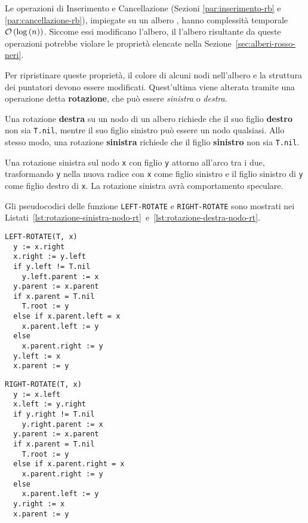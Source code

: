 \documentclass[italian, 10pt]{article}
\begin{document}
Le operazioni di Inserimento e Cancellazione (Sezioni \ref{par:inserimento-rb} e \ref{par:cancellazione-rb}), impiegate su un albero \RB, hanno complessità temporale \(\mathcal{O}\left(\log{(n)}\right)\).
Siccome essi modificano l'albero, il l'albero risultante da queste operazioni potrebbe violare le proprietà elencate nella Sezione~\ref{sec:alberi-rosso-neri}.

Per ripristinare queste proprietà, il colore di alcuni nodi nell'albero e la struttura dei puntatori devono essere modificati.
Quest'ultima viene alterata tramite una operazione detta \textbf{rotazione}, che può essere \textit{sinistra} o \textit{destra}.

Una rotazione \textbf{destra} su un nodo di un albero \RB richiede che il suo figlio \textbf{destro} non sia \texttt{T.nil}, mentre il suo figlio sinistro può essere un nodo qualsiasi.
Allo stesso modo, una rotazione \textbf{sinistra} richiede che il figlio \textbf{sinistro} non sia \texttt{T.nil}.

Una rotazione sinistra sul nodo \texttt{x} con figlio \texttt{y}  attorno all'arco tra i due, trasformando \texttt{y} nella nuova radice con \texttt{x} come figlio sinistro e il figlio sinistro di \texttt{y} come figlio destro di \texttt{x}.
La rotazione sinistra avrà comportamento speculare.

\bigskip
Gli pseudocodici delle funzione \texttt{LEFT-ROTATE} e \texttt{RIGHT-ROTATE} sono mostrati nei Listati~\ref{lst:rotazione-sinistra-nodo-rt}~e~\ref{lst:rotazione-destra-nodo-rt}.

\begin{minipage}[t]{0.495\linewidth}
  \begin{lstlisting}[style=pseudocode, caption={Rotazione sinistra di un nodo in un RB}, label={lst:rotazione-sinistra-nodo-rt}]
LEFT-ROTATE(T, x)
  y := x.right
  x.right := y.left
  if y.left != T.nil
    y.left.parent := x
  y.parent := x.parent
  if x.parent = T.nil
    T.root := y
  else if x.parent.left = x
    x.parent.left := y
  else
    x.parent.right := y
  y.left := x
  x.parent := y
  \end{lstlisting}
\end{minipage}
\begin{minipage}[t]{0.495\linewidth}
  \begin{lstlisting}[style=pseudocode, caption={Rotazione destra di un nodo in un RB}, label={lst:rotazione-destra-nodo-rt}]
RIGHT-ROTATE(T, x)
  y := x.left
  x.left := y.right
  if y.right != T.nil
    y.right.parent := x
  y.parent := x.parent
  if x.parent = T.nil
    T.root := y
  else if x.parent.right = x
    x.parent.right := y
  else
    x.parent.left := y
  y.right := x
  x.parent := y
  \end{lstlisting}
\end{minipage}
\end{document}

